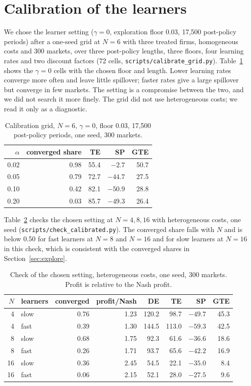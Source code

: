 \documentclass[11pt]{article}
\begin{document}
\section{Calibration of the learners}\label{app:calib}
We chose the learner setting ($\gamma=0$, exploration floor 0.03, 17,500 post-policy periods) after a one-seed grid at $N=6$ with three treated firms, homogeneous costs and 300 markets, over three post-policy lengths, three floors, four learning rates and two discount factors (72 cells, \texttt{scripts/calibrate\_grid.py}). Table~\ref{tab:calib} shows the $\gamma=0$ cells with the chosen floor and length. Lower learning rates converge more often and leave little spillover; faster rates give a large spillover but converge in few markets. The setting is a compromise between the two, and we did not search it more finely. The grid did not use heterogeneous costs; we read it only as a diagnostic.
\begin{table}[h]\centering\small
\caption{Calibration grid, $N=6$, $\gamma=0$, floor 0.03, 17,500 post-policy periods, one seed, 300 markets.}\label{tab:calib}
\begin{tabular}{rrrrr}\hline
$\alpha$ & converged share & TE & SP & GTE \\\hline
0.02 & 0.98 & 55.4 & $-2.7$ & 50.7 \\
0.05 & 0.79 & 72.7 & $-44.7$ & 27.5 \\
0.10 & 0.42 & 82.1 & $-50.9$ & 28.8 \\
0.20 & 0.03 & 85.7 & $-49.3$ & 26.4 \\\hline
\end{tabular}\end{table}
Table~\ref{tab:calibcheck} checks the chosen setting at $N=4,8,16$ with heterogeneous costs, one seed (\texttt{scripts/check\_calibrated.py}). The converged share falls with $N$ and is below 0.50 for fast learners at $N=8$ and $N=16$ and for slow learners at $N=16$ in this check, which is consistent with the converged shares in Section~\ref{sec:explore}.
\begin{table}[h]\centering\small
\caption{Check of the chosen setting, heterogeneous costs, one seed, 300 markets. Profit is relative to the Nash profit.}\label{tab:calibcheck}
\begin{tabular}{rlrrrrrr}\hline
$N$ & learners & converged & profit/Nash & DE & TE & SP & GTE \\\hline
4 & slow & 0.76 & 1.23 & 120.2 & 98.7 & $-49.7$ & 45.3 \\
4 & fast & 0.39 & 1.30 & 144.5 & 113.0 & $-59.3$ & 42.5 \\
8 & slow & 0.68 & 1.75 & 92.3 & 61.6 & $-36.6$ & 18.6 \\
8 & fast & 0.26 & 1.71 & 93.7 & 65.6 & $-42.2$ & 16.9 \\
16 & slow & 0.36 & 2.45 & 54.5 & 22.1 & $-35.0$ & 8.4 \\
16 & fast & 0.06 & 2.15 & 52.1 & 28.0 & $-27.5$ & 9.6 \\\hline
\end{tabular}\end{table}
\end{document}
